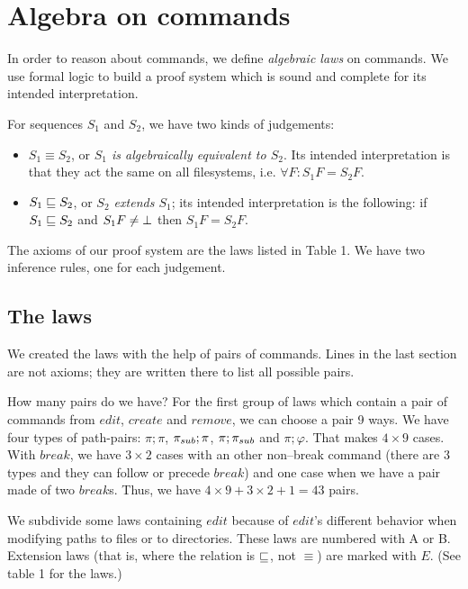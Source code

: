 \section{Algebra on commands}
\label{theorem:laws}

In order to reason about commands, we define \emph{algebraic laws} on
commands. We use formal logic to build a proof system which is sound and
complete for its intended interpretation.

For sequences \(S_1\) and \(S_2\), we have two kinds of judgements:
\begin{itemize}
\item \(S_1\equiv S_2\), or \emph{\(S_1\) is algebraically equivalent to
\(S_2\)}. Its intended interpretation is that they act the same on all
filesystems, i.e. \(\forall F: S_1F=S_2F\).
\item \(S_1\sqsubseteq S_2\), or \emph{\(S_2\) extends \(S_1\)}; its intended
interpretation is the following: if \(S_1\sqsubseteq S_2\) and 
\(S_1F\ne\bot\) then \(S_1F=S_2F\).
\end{itemize}

The axioms of our proof system are the laws listed in Table 1. We have two
inference rules, one for each judgement.

\subsection{The laws}

We created the laws with the help of pairs of commands.
Lines in the last section are not axioms; they are written
there to list all possible pairs.

\begin{notrsi}
\medskip
{\small{
How many pairs do we have? 
For the first group of laws which contain a pair of commands from
\(edit\), \(create\) and \(remove\), we can choose a pair 9 ways.
We have four types of
path-pairs: \(\pi;\pi\), \(\pi_{sub};\pi\), \(\pi;\pi_{sub}\)
and \(\pi;\varphi\). That makes \(4\times9\) cases. With \(break\), we have
\(3\times 2\) cases
with an other non--break command (there are 3 types and they can follow
or precede \(break\)) and one case when we have a pair made of two
\(break\)s. Thus, we have \(4\times 9+3\times2+1=43\) pairs. 
}}
\medskip
\end{notrsi}

We subdivide some laws containing \(edit\) because of \(edit\)'s different
behavior when modifying paths to files or to directories. These laws are
numbered with A or B.
Extension laws (that is, where the relation is \(\sqsubseteq\), not
\(\equiv\)) are marked with \(E\).
(See table 1 for the laws.)

